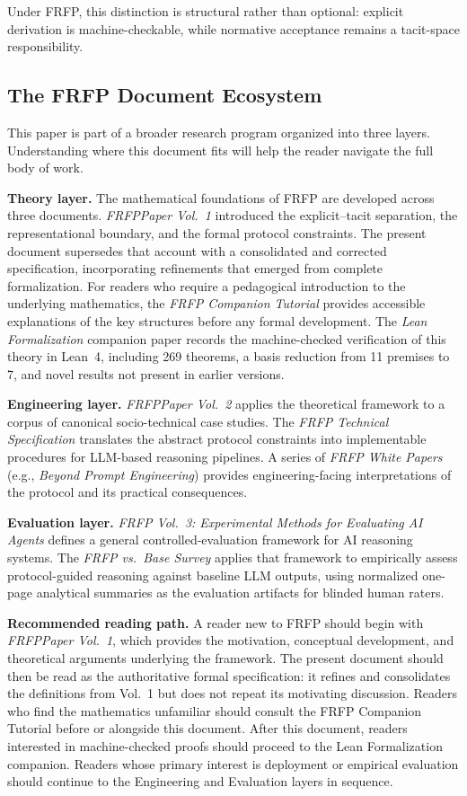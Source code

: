 Under FRFP, this distinction is structural rather than optional: explicit derivation is
machine-checkable, while normative acceptance remains a tacit-space responsibility.

\subsection*{The FRFP Document Ecosystem}

This paper is part of a broader research program organized into three layers. Understanding
where this document fits will help the reader navigate the full body of work.

\textbf{Theory layer.} The mathematical foundations of FRFP are developed across three documents.
\textit{FRFPPaper Vol.~1} introduced the explicit--tacit separation, the representational boundary,
and the formal protocol constraints. The present document supersedes that account with a
consolidated and corrected specification, incorporating refinements that emerged from complete
formalization. For readers who require a pedagogical introduction to the underlying mathematics,
the \textit{FRFP Companion Tutorial} provides accessible explanations of the key structures
before any formal development. The \textit{Lean Formalization} companion paper records the
machine-checked verification of this theory in Lean~4, including 269 theorems, a basis reduction
from 11 premises to 7, and novel results not present in earlier versions.

\textbf{Engineering layer.} \textit{FRFPPaper Vol.~2} applies the theoretical framework to a
corpus of canonical socio-technical case studies. The \textit{FRFP Technical Specification}
translates the abstract protocol constraints into implementable procedures for LLM-based
reasoning pipelines. A series of \textit{FRFP White Papers} (e.g., \textit{Beyond Prompt
Engineering}) provides engineering-facing interpretations of the protocol and its practical
consequences.

\textbf{Evaluation layer.} \textit{FRFP Vol.~3: Experimental Methods for Evaluating AI Agents} defines a
general controlled-evaluation framework for AI reasoning systems. The \textit{FRFP vs.\ Base
Survey} applies that framework to empirically assess protocol-guided reasoning against baseline
LLM outputs, using normalized one-page analytical summaries as the evaluation artifacts for
blinded human raters.

\medskip
\noindent\textbf{Recommended reading path.} A reader new to FRFP should begin with
\textit{FRFPPaper Vol.~1}, which provides the motivation, conceptual development, and
theoretical arguments underlying the framework. The present document should then be read
as the authoritative formal specification: it refines and consolidates the definitions from
Vol.~1 but does not repeat its motivating discussion. Readers who find the mathematics
unfamiliar should consult the FRFP Companion Tutorial before or alongside this document.
After this document, readers interested in machine-checked proofs should proceed to the
Lean Formalization companion. Readers whose primary interest is deployment or empirical
evaluation should continue to the Engineering and Evaluation layers in sequence.

